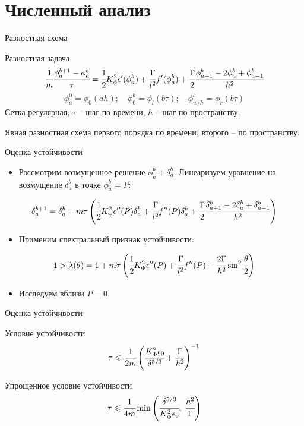 \documentclass[aspectratio=169]{beamer}
\begin{document}
\section{Численный анализ}

\begin{frame}{Разностная схема}
\begin{block}{Разностная задача}
	$$\cfrac{1}{m} \cfrac{\phi_a^{b + 1} - \phi_a^b}{\tau} = \cfrac{1}{2} K_\phi^2
	\epsilon'(\phi_a^b) + \cfrac{\Gamma}{l^2} f'(\phi_a^b) + \cfrac{\Gamma}{2}
	\cfrac{\phi_{a + 1}^b - 2 \phi_a^b + \phi_{a - 1}^b}{h^2}$$
	$$\phi_a^0 = \phi_0(ah); \quad \phi_0^b = \phi_l(b \tau); \quad \phi_{w/h}^b = \phi_r(b \tau)$$
	Сетка регулярная; $\tau$ -- шаг по времени, $h$ -- шаг по пространству.
\end{block}
Явная разностная схема первого порядка по времени, второго -- по пространству.
\end{frame}


\begin{frame}{Оценка устойчивости}
\begin{itemize}
\item Рассмотрим возмущенное решение $\phi_a^b + \delta_a^b$. Линеаризуем уравнение на возмущение
$\delta_a^b$ в точке $\phi_a^b = P$:
\end{itemize}
$$\delta_a^{b + 1} = \delta_a^b + m \tau \left( \cfrac{1}{2} K_\Phi^2 \epsilon''(P) \delta_a^b +
\cfrac{\Gamma}{l^2} f''(P) \delta_a^b + \cfrac{\Gamma}{2} \cfrac{\delta_{a + 1}^b - 2 \delta_a^b +
\delta_{a - 1}^b}{h^2} \right)$$
\begin{itemize}
\item Применим спектральный признак устойчивости:
\end{itemize}
$$1 > \lambda(\theta) = 1 + m \tau \left( \cfrac{1}{2} K_\Phi^2 \epsilon''(P) +
\cfrac{\Gamma}{l^2} f''(P) - \cfrac{2 \Gamma}{h^2} \sin^2 \cfrac{\theta}{2} \right)$$
\begin{itemize}
\item Исследуем вблизи $P = 0$.
\end{itemize}
\end{frame}


\begin{frame}{Оценка устойчивости}
\begin{block}{Условие устойчивости}
	$$\tau \leqslant \cfrac{1}{2m} \left( \cfrac{K_\Phi^2 \epsilon_0}{\delta^{5/3}} +
	\cfrac{\Gamma}{h^2} \right)^{-1}$$
\end{block}
\begin{block}{Упрощенное условие устойчивости}
	$$\tau \leqslant \cfrac{1}{4m} \min \left(\cfrac{\delta^{5/3}}{K_\Phi^2 \epsilon_0}, \;
	\cfrac{h^2}{\Gamma} \right)$$
\end{block}
\end{frame}
\end{document}
